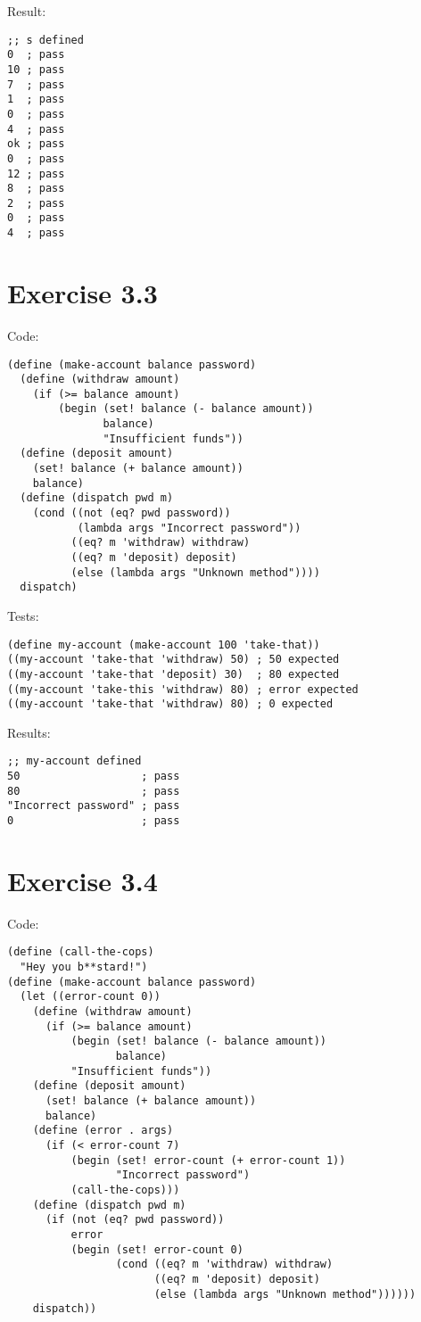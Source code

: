 \documentclass[../main.tex]{subfiles}
\begin{document}
Result:

\begin{lstlisting}
;; s defined
0  ; pass
10 ; pass
7  ; pass
1  ; pass
0  ; pass
4  ; pass
ok ; pass
0  ; pass
12 ; pass
8  ; pass
2  ; pass
0  ; pass
4  ; pass
\end{lstlisting}

\section{Exercise 3.3}

Code:

\begin{lstlisting}
(define (make-account balance password)
  (define (withdraw amount)
    (if (>= balance amount)
        (begin (set! balance (- balance amount))
               balance)
               "Insufficient funds"))
  (define (deposit amount)
    (set! balance (+ balance amount))
    balance)
  (define (dispatch pwd m)
    (cond ((not (eq? pwd password))
           (lambda args "Incorrect password"))
          ((eq? m 'withdraw) withdraw)
          ((eq? m 'deposit) deposit)
          (else (lambda args "Unknown method"))))
  dispatch)
\end{lstlisting}

Tests:

\begin{lstlisting}
(define my-account (make-account 100 'take-that))
((my-account 'take-that 'withdraw) 50) ; 50 expected
((my-account 'take-that 'deposit) 30)  ; 80 expected
((my-account 'take-this 'withdraw) 80) ; error expected
((my-account 'take-that 'withdraw) 80) ; 0 expected
\end{lstlisting}

Results:

\begin{lstlisting}
;; my-account defined
50                   ; pass
80                   ; pass
"Incorrect password" ; pass
0                    ; pass
\end{lstlisting}

\section{Exercise 3.4}

Code:

\begin{lstlisting}
(define (call-the-cops)
  "Hey you b**stard!")
(define (make-account balance password)
  (let ((error-count 0))
    (define (withdraw amount)
      (if (>= balance amount)
          (begin (set! balance (- balance amount))
                 balance)
          "Insufficient funds"))
    (define (deposit amount)
      (set! balance (+ balance amount))
      balance)
    (define (error . args)
      (if (< error-count 7)
          (begin (set! error-count (+ error-count 1))
                 "Incorrect password")
          (call-the-cops)))
    (define (dispatch pwd m)
      (if (not (eq? pwd password))
          error
          (begin (set! error-count 0)
                 (cond ((eq? m 'withdraw) withdraw)
                       ((eq? m 'deposit) deposit)
                       (else (lambda args "Unknown method"))))))
    dispatch))
\end{lstlisting}
\end{document}
